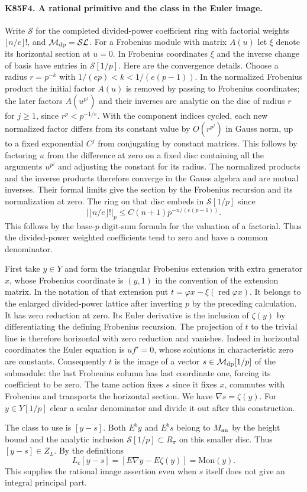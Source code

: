 \paragraph{K85F4. A rational primitive and the class in the Euler image.}
Write $\mathcal S$ for the completed divided-power coefficient ring
with factorial weights $\lfloor n/e\rfloor !$, and
$\mathcal M_{\rm dp}=\mathcal S\mathcal L$. For a Frobenius
module with matrix $A(u)$ let $\xi$ denote its horizontal section
at $u=0$. In Frobenius coordinates $\xi$ and the inverse change
of basis have entries in $\mathcal S[1/p]$. Here are the
convergence details. Choose a radius $r=p^{-k}$ with
$1/(ep)<k<1/(e(p-1))$. In the normalized Frobenius product the
initial factor $A(u)$ is removed by passing to Frobenius coordinates;
the later factors $A(u^{p^j})$ and their inverses are analytic on
the disc of radius $r$ for $j\ge1$, since $r^p<p^{-1/e}$.
With the component indices cycled, each new normalized factor differs
from its constant value by $O(r^{p^j})$ in Gauss norm, up to a
fixed exponential $C^j$ from conjugating by constant matrices.
This follows by factoring $u$ from the difference at zero on a
fixed disc containing all the arguments $u^{p^j}$ and adjusting
the constant for its radius. The normalized products and the inverse
products therefore converge in the Gauss algebra and are mutual
inverses. Their formal limits give the section by the Frobenius
recursion and its normalization at zero. The ring on that disc
embeds in $\mathcal S[1/p]$ since
\[
 |\lfloor n/e\rfloor !|_p
 \le C(n+1)p^{-n/(e(p-1))}.
\]
This follows by the base-$p$ digit-sum formula for the valuation
of a factorial. Thus the divided-power weighted coefficients tend
to zero and have a common denominator.

First take $y\in Y$ and form the triangular Frobenius extension
with extra generator $x$, whose Frobenius coordinate is $(y,1)$
in the convention of the extension matrix. In the notation of
that extension put $t=\varphi x-\xi(\operatorname{red}\varphi x)$.
It belongs to the enlarged divided-power lattice after inverting
$p$ by the preceding calculation. It has zero reduction at zero.
Its Euler derivative is the inclusion of $\zeta(y)$ by
differentiating the defining Frobenius recursion. The projection of
$t$ to the trivial line is therefore horizontal with zero reduction
and vanishes. Indeed in horizontal coordinates the Euler equation
is $u f'=0$, whose solutions in characteristic zero are constants.
Consequently $t$ is the image of a vector $s\in
\mathcal M_{\rm dp}[1/p]$ of the submodule: the last Frobenius
column has last coordinate one, forcing its coefficient to be zero.
The tame action fixes $s$ since it fixes $x$, commutes with
Frobenius and transports the horizontal section. We have
$\nabla s=\zeta(y)$. For $y\in Y[1/p]$ clear a scalar
denominator and divide it out after this construction.

The class to use is $[y-s]$. Both $E^b y$ and $E^b s$ belong to
$M_{\rm an}$ by the height bound and the analytic inclusion
$\mathcal S[1/p]\subset R_\pi$ on this smaller disc. Thus
$[y-s]\in Z_L$. By the definitions
\[
 L_c[y-s]=[E\nabla y-E\zeta(y)]=\mathrm{Mon}(y).
\]
This supplies the rational image assertion even when $s$ itself
does not give an integral principal part.
